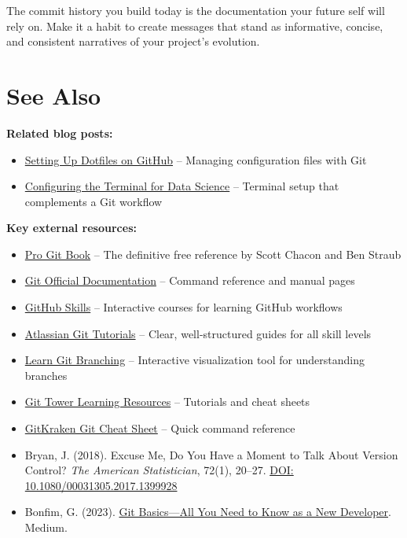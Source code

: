 \documentclass[
  letterpaper,
  DIV=11,
  numbers=noendperiod]{scrartcl}
\providecommand{\tightlist}{%
  \setlength{\itemsep}{0pt}\setlength{\parskip}{0pt}}
\begin{document}
The commit history you build today is the documentation your future self
will rely on. Make it a habit to create messages that stand as
informative, concise, and consistent narratives of your project's
evolution.

\section{See Also}\label{see-also}

\textbf{Related blog posts:}

\begin{itemize}
\tightlist
\item
  \href{../24-setupdotfilesongithub/setupdotfilesongithub/analysis/report/index.qmd}{Setting
  Up Dotfiles on GitHub} -- Managing configuration files with Git
\item
  \href{../01-configtermzsh/configtermzsh/analysis/report/index.qmd}{Configuring
  the Terminal for Data Science} -- Terminal setup that complements a
  Git workflow
\end{itemize}

\textbf{Key external resources:}

\begin{itemize}
\tightlist
\item
  \href{https://git-scm.com/book/en/v2}{Pro Git Book} -- The definitive
  free reference by Scott Chacon and Ben Straub
\item
  \href{https://git-scm.com/doc}{Git Official Documentation} -- Command
  reference and manual pages
\item
  \href{https://skills.github.com/}{GitHub Skills} -- Interactive
  courses for learning GitHub workflows
\item
  \href{https://www.atlassian.com/git/tutorials}{Atlassian Git
  Tutorials} -- Clear, well-structured guides for all skill levels
\item
  \href{https://learngitbranching.js.org/}{Learn Git Branching} --
  Interactive visualization tool for understanding branches
\item
  \href{https://www.git-tower.com/learn/}{Git Tower Learning Resources}
  -- Tutorials and cheat sheets
\item
  \href{https://www.gitkraken.com/git-cheat-sheet}{GitKraken Git Cheat
  Sheet} -- Quick command reference
\item
  Bryan, J. (2018). Excuse Me, Do You Have a Moment to Talk About
  Version Control? \emph{The American Statistician}, 72(1), 20--27.
  \href{https://doi.org/10.1080/00031305.2017.1399928}{DOI:
  10.1080/00031305.2017.1399928}
\item
  Bonfim, G. (2023).
  \href{https://gabrielbonfim1.medium.com/git-basics-all-you-need-to-know-as-a-new-developer-f4d905e4e144}{Git
  Basics---All You Need to Know as a New Developer}. Medium.
\end{itemize}
\end{document}
